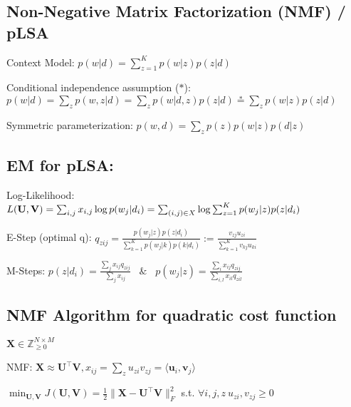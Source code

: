 \documentclass[a4paper, 11pt, landscape]{article}
\newenvironment{inlinelist}%
{\begin{enumerate*}[label=\textbf{\color{red}\theenumi.}]}%
{\end{enumerate*}}
\begin{document}
\begin{multicols*}{3}
\section{Non-Negative Matrix Factorization (NMF) / pLSA}
\begin{compactdesc}
	\item[Context Model:] $p(w | d) = \sum_{z=1}^K p(w | z) p(z | d)$
	\item[Conditional independence assumption ($*$):] $p(w|d) = \sum_z p(w,z|d) = \sum_z p(w|d,z)p(z|d) \stackrel{*}{=} \sum_z p(w|z)p(z|d)$ 
	\item[Symmetric parameterization:] $p(w, d) = \sum_z p(z)p(w | z) p(d | z)$
\end{compactdesc}

\subsection{EM for pLSA:}
\begin{compactenum}
  \item Log-Likelihood: $L(\mathbf{U}, \mathbf{V}) = \sum_{i,j} x_{i,j}\log p(w_j|d_i) = \break \sum_{(i,j) \in X} \log \sum_{z=1}^K p(w_j|z)p(z|d_i)$
	\item E-Step (optimal q): $q_{zij} = \frac{p(w_j|z)p(z|d_i)}{\sum_{k=1}^K p(w_j|k)p(k|d_i)} := \frac{v_{zj}u_{zi}}{\sum_{k=1}^K v_{kj}u_{ki}}$
	\item M-Steps: $p(z|d_i) = \frac{\sum_j x_{ij}q_{zij}}{\sum_j x_{ij}}\hspace{10pt}\&\hspace{10pt} p(w_j|z) = \frac{\sum_i x_{ij}q_{zij}}{\sum_{i,l}x_{il}q_{zil}}$
\end{compactenum}

\subsection{NMF Algorithm for quadratic cost function}
\begin{inlinelist}
	\item $\mathbf{X} \in \mathbb{Z}^{N \times M}_{\geq 0}$
	\item NMF: $\mathbf{X} \approx \mathbf{U^\top V}, x_{ij} = \sum_z u_{zi}v_{zj} = \langle \mathbf{u}_i, \mathbf{v}_j \rangle$
\end{inlinelist}

$\min_{\mathbf{U}, \mathbf{V}} J(\mathbf{U}, \mathbf{V}) = \frac{1}{2} \|\mathbf{X} - \mathbf{U}^\top\mathbf{V}\|_F^2$ s.t. $\forall i,j,z~u_{zi},v_{zj} \geq 0 $


\end{multicols*}
\end{document}
